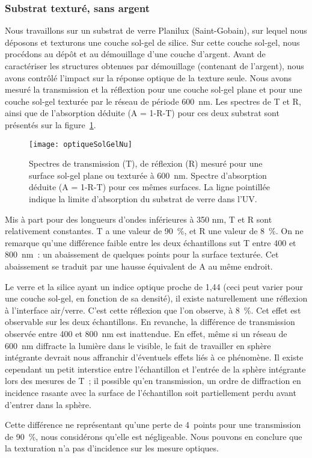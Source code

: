 	\subsubsection{Substrat texturé, sans argent}
Nous travaillons sur un substrat de verre Planilux (Saint-Gobain), sur lequel nous déposons et texturons une couche sol-gel de silice. Sur cette couche sol-gel, nous procédons au dépôt et au démouillage d'une couche d'argent. Avant de caractériser les structures obtenues par démouillage (contenant de l'argent), nous avons contrôlé l’impact sur la réponse optique de la texture seule. Nous avons mesuré la transmission et la réflextion pour une couche sol-gel plane et pour une couche sol-gel texturée par le réseau de période 600~nm. Les spectres de T et R, ainsi que de l’absorption déduite (A = 1-R-T) pour ces deux substrat sont présentés sur la figure~\ref{optiqueSolGelNu}.\par 
\begin{figure}[!htb]
\centering
\texttt{[image: optiqueSolGelNu]}
\caption{Spectres de transmission (T), de réflexion (R) mesuré pour une surface sol-gel plane ou texturée à 600~nm. Spectre d’absorption déduite (A = 1-R-T) pour ces mêmes surfaces. La ligne pointillée indique la limite d’absorption du substrat de verre dans l’UV.}
\label{optiqueSolGelNu}
\end{figure}
Mis à part pour des longueurs d’ondes inférieures à 350 nm, T et R sont relativement constantes. T a une valeur de 90~\%, et R une valeur de 8~\%. On ne remarque qu’une différence faible entre les deux échantillons sut T entre 400 et 800~nm~: un abaissement de quelques points pour la surface texturée. Cet abaissement se traduit par une hausse équivalent de A au même endroit.\par 
Le verre et la silice ayant un indice optique proche de 1,44 (ceci peut varier pour une couche sol-gel, en fonction de sa densité), il existe naturellement une réflexion à l'interface air/verre. C'est cette réflexion que l'on observe, à 8~\%. Cet effet est observable sur les deux échantillons. En revanche, la différence de transmission observée entre 400 et 800~nm est inattendue. En effet, même si un réseau de 600~nm diffracte la lumière dans le visible, le fait de travailler en sphère intégrante devrait nous affranchir d'éventuels effets liés à ce phénomène. Il existe cependant un petit interstice entre l'échantillon et l'entrée de la sphère intégrante lors des mesures de T~; il possible qu'en transmission, un ordre de diffraction en incidence rasante avec la surface de l'échantillon soit partiellement perdu avant d'entrer dans la sphère.\par 
Cette différence ne représentant qu'une perte de 4~points pour une transmission de 90~\%, nous considérons qu'elle est négligeable. Nous pouvons en conclure que la texturation n'a pas d'incidence sur les mesure optiques.\par 

